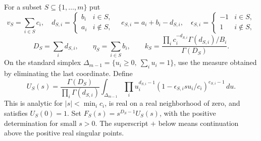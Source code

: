 \documentclass[11pt,a4paper]{article}
\theoremstyle{definition}
\theoremstyle{remark}
\numberwithin{equation}{section}
\begin{document}
For a subset $S\subseteq\{1,\ldots,m\}$ put
\[
 v_S=\sum_{i\in S}c_i,\quad
 d_{S,i}=\begin{cases}b_i&i\in S,\\a_i&i\notin S,\end{cases}
 \quad e_{S,i}=a_i+b_i-d_{S,i},\quad
 \epsilon_{S,i}=\begin{cases}-1&i\in S,\\1&i\notin S,\end{cases}
\]
\[
 D_S=\sum_i d_{S,i},\qquad \eta_S=\sum_{i\in S}b_i,\qquad
 k_S=\frac{\prod_i c_i^{-d_{S,i}}\Gamma(d_{S,i})/B_i}{\Gamma(D_S)}.
\]
On the standard simplex $\Delta_{m-1}=\{u_i\ge0,\ \sum_i u_i=1\}$,
use the measure obtained by eliminating the last coordinate. Define
\begin{equation}\label{p9:bsc:U}
 U_S(s)=\frac{\Gamma(D_S)}{\prod_i\Gamma(d_{S,i})}
 \int_{\Delta_{m-1}}\prod_i u_i^{d_{S,i}-1}
       \left(1-\epsilon_{S,i}s u_i/c_i\right)^{e_{S,i}-1}\,du.
\end{equation}
This is analytic for $|s|<\min_i c_i$, is real on a real neighborhood
of zero, and satisfies $U_S(0)=1$. Set $F_S(s)=s^{D_S-1}U_S(s)$,
with the positive determination for small $s>0$. The superscript $+$
below means continuation above the positive real singular points.
\end{document}
